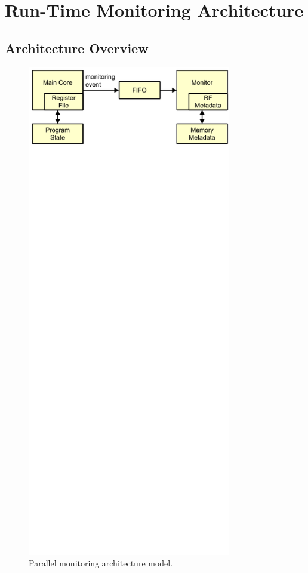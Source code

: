 \section{Run-Time Monitoring Architecture}
\label{sec:monitoring_wcet.monitoring}

\subsection{Architecture Overview}

\begin{figure}
  \begin{center}
    \includegraphics[width=3.5in]{monitoring_wcet/figs/arch.pdf}
    \caption{Parallel monitoring architecture model.}
    \label{fig:monitoring_wcet.monitoring.overview} 
  \end{center}
\end{figure}

